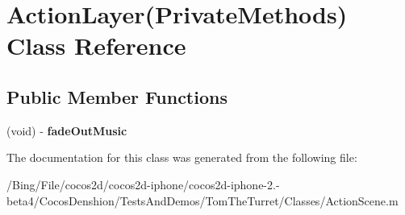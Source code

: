 \hypertarget{interface_action_layer_07_private_methods_08}{\section{Action\-Layer(Private\-Methods) Class Reference}
\label{interface_action_layer_07_private_methods_08}
}
\subsection*{Public Member Functions}
\begin{DoxyCompactItemize}
\item 
\hypertarget{interface_action_layer_07_private_methods_08_affb8e2011e0e6d9d4e98ffff60a80d96}{(void) -\/ {\bfseries fade\-Out\-Music}}\label{interface_action_layer_07_private_methods_08_affb8e2011e0e6d9d4e98ffff60a80d96}

\end{DoxyCompactItemize}


The documentation for this class was generated from the following file\-:\begin{DoxyCompactItemize}
\item 
/\-Bing/\-File/cocos2d/cocos2d-\/iphone/cocos2d-\/iphone-\/2.-\/beta4/\-Cocos\-Denshion/\-Tests\-And\-Demos/\-Tom\-The\-Turret/\-Classes/Action\-Scene.\-m\end{DoxyCompactItemize}
